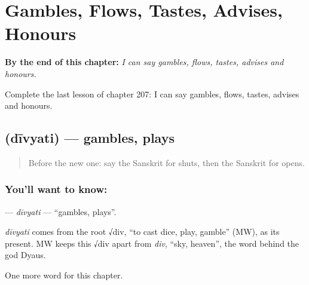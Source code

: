 
\chapter{Gambles, Flows, Tastes, Advises, Honours}
\label{ch:sa-gambles-flows-tastes-advises-honours}

\begin{chapteropening}
\textbf{By the end of this chapter:} \emph{I can say gambles, flows, tastes, advises and honours.}

Complete the last lesson of chapter 207: I can say gambles, flows, tastes, advises and honours.
\end{chapteropening}

\section[\texorpdfstring{\sk{दीव्यति} (dīvyati)}{दीव्यति (dīvyati)}]{ (dīvyati) — gambles, plays}

\label{lesson:SA-C207-divyati}



\begin{quote}
Before the new one: say the Sanskrit for shuts, then the Sanskrit for opens.
\end{quote}

\subsection*{You'll want to know: }
\textbf{} — \emph{dīvyati} — \textquotedblleft{}gambles, plays\textquotedblright{}.

\begin{cousinweb}
\emph{dīvyati} comes from the root √div, \textquotedblleft{}to cast dice, play, gamble\textquotedblright{} (MW), as its present. MW keeps this √div apart from \emph{div}, \textquotedblleft{}sky, heaven\textquotedblright{}, the word behind the god Dyaus.
\end{cousinweb}

\begin{grammarlens}[title={What you've built}]
One more word for this chapter.
\end{grammarlens}

